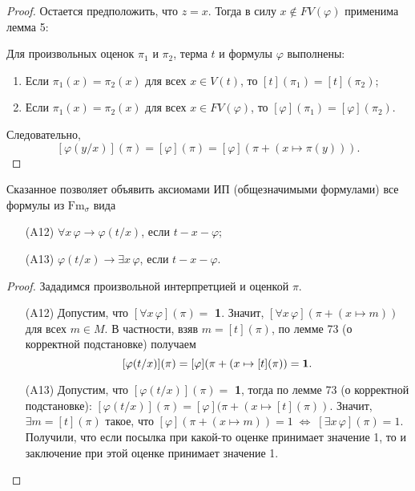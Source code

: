 \documentclass[a4paper, fleqn]{article}
\begin{document}
\begin{proof}
    Остается предположить, что $z = x$. Тогда в силу $x \not\in FV(\varphi)$ применима лемма 5:
    \begin{lemma}[5] Для произвольных оценок $\pi_1$ и $\pi_2$, терма $t$ и формулы $\varphi$ выполнены:\\[-25 pt]
        \begin{enumerate}
            \item Если $\pi_1(x) = \pi_2(x)$ для всех $x \in V(t)$, то $[t](\pi_1) = [t](\pi_2)$;
            \item Если $\pi_1(x) = \pi_2(x)$ для всех $x \in FV(\varphi)$, то $[\varphi](\pi_1) = [\varphi](\pi_2)$.
        \end{enumerate}
    \end{lemma}
    Следовательно,
    \[ [\varphi(y/x)](\pi) = [\varphi](\pi) = [\varphi](\pi + (x \mapsto \pi(y))). \]
    \end{proof}
    
    Сказанное позволяет объявить аксиомами ИП (общезначимыми формулами) все формулы из $\text{Fm}_{\sigma}$ вида\\[-25 pt]
    \begin{enumerate}
    \item[(A12)] $\forall x\, \varphi \to \varphi(t/x)$, если $t-x-\varphi$;
    \item[(A13)] $\varphi(t/x) \to \exists x\, \varphi$, если $t-x-\varphi$.
    \end{enumerate}
    \begin{proof} Зададимся произвольной интерпретцией и оценкой $\pi$.\\[-20 pt]
        \begin{enumerate}
        \item[(A12)] Допустим, что $[\forall x\, \varphi](\pi) =$\textbf{ 1}. Значит, $[\forall x\, \varphi](\pi + (x \mapsto m))$ для всех $m \in M$. В частности, взяв $m = [t](\pi)$, по лемме 73 (о корректной подстановке) получаем
        \[ [\varphi(t/x)](\pi) = [\varphi](\pi + (x \mapsto [t](\pi)) = \text{\bf 1}. \]
        \item[(A13)] Допустим, что $[\varphi(t/x)](\pi) =$ \textbf{ 1}, тогда по лемме 73 (о корректной подстановке): $[\varphi(t/x)](\pi) = [\varphi](\pi + (x \mapsto [t](\pi))$. Значит, $\exists m = [t](\pi)$ такое, что $[\varphi](\pi + (x \mapsto m)) = 1 \; \Leftrightarrow \; [\exists x\, \varphi](\pi) = 1$. Получили, что если посылка при какой-то оценке принимает значение 1, то и заключение при этой оценке принимает значение 1.
        \end{enumerate}
    \end{proof}
\end{document}
